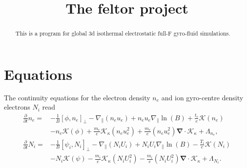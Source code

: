 \documentclass{hitec} %
\renewcommand{\vec}[1]{\boldsymbol{#1}}
\begin{document}
\title{The feltor project}
\maketitle

\begin{abstract}
This is a program for global 3d isothermal electrostatic full-F gyro-fluid simulations.
\end{abstract}

\section{Equations}
The continuity equations for the electron density \(n_e\) and  ion gyro-centre density electrons  \(N_i\) read
\begin{align}
 \frac{\partial}{\partial t}n_e =&
 - \frac{1}{B}\left[\phi,  n_e \right]_{\perp}
 -  {\nabla}_{\parallel}( n_e u_e)
 + n_e u_e   {\nabla}_{\parallel} \ln{(B)} 
+ \frac{t_e }{e }  \mathcal{K} \left( n_e\right)
\nonumber  \\ &
-   n_e \mathcal{K}(\phi) 
   +  \frac{m_e }{ e } \mathcal{K}_{\kappa} \left( n_e u_e^2 \right) 
   + \frac{m_e }{ e } \left( n_e u_e^2 \right) \vec{\nabla} \cdot  \vec{\mathcal{K}}_{\kappa} 
   + \Lambda_{n_e} ,\\
\frac{\partial}{\partial t}N_i =&
 - \frac{1}{B}\left[\psi_i,  N_i \right]_{\perp}
 - {\nabla}_{\parallel}(N_i U_i)
 + N_i U_i   {\nabla}_{\parallel} \ln{(B)} 
- \frac{T_i }{e }  \mathcal{K} \left( N_i\right)
\nonumber  \\ &
-   N_i \mathcal{K}(\psi) 
- \frac{m_i }{ e }\mathcal{K}_{\kappa}  \left( N_i U_i^2 \right)
- \frac{m_i }{ e } \left( N_i U_i^2 \right)\vec{\nabla} \cdot  \vec{\mathcal{K}}_{\kappa} 
+ \Lambda_{N_i} .
\end{align}
\end{document}
